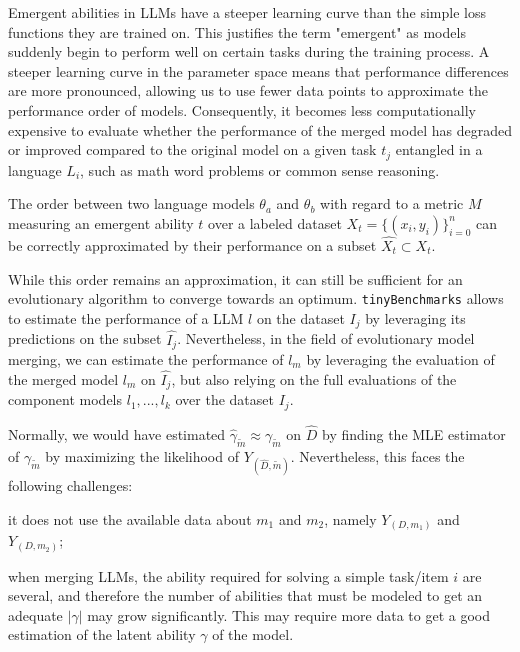
Emergent abilities in LLMs have a steeper learning curve than the simple loss functions they are trained on. This justifies the term "emergent" as models suddenly begin to perform well on certain tasks during the training process. A steeper learning curve in the parameter space means that performance differences are more pronounced, allowing us to use fewer data points to approximate the performance order of models. Consequently, it becomes less computationally expensive to evaluate whether the performance of the merged model has degraded or improved compared to the original model on a given task $t_j$ entangled in a language $L_i$, such as math word problems or common sense reasoning.
\begin{conjecture}\label{conj:approx}
    The order between two language models $\theta_{a}$ and $\theta_{b}$ with regard to a metric $M$ measuring an emergent ability $t$ over a labeled dataset $X_{t}=\{(x_i,y_i)\}_{i=0}^n$ can be correctly approximated by their performance on a subset $\hat{X_t} \subset X_t$.
\end{conjecture}
While this order remains an approximation, it can still be sufficient for an evolutionary algorithm to converge towards an optimum. 
\texttt{tinyBenchmarks} \citep{tinybenchmarks} allows to estimate the performance of a LLM $l$ on the dataset $I_j$ by leveraging its predictions on the subset $\hat{I_j}$. Nevertheless, in the field of evolutionary model merging, we can estimate the performance of $l_m$ by leveraging the evaluation of the merged model $l_m$ on $\hat{I_j}$, but also relying on the full evaluations of the component models $l_1,...,l_k$ over the dataset $I_j$.





Normally, we would have estimated $\hat{\gamma}_{\tilde{m}} \approx \gamma_{\tilde{m}}$ on $\hat{D}$ by finding the MLE estimator of  $\gamma_{\tilde{m}}$ by maximizing the likelihood of $Y_{(\hat{D},\tilde{m})}$. Nevertheless, this faces the following challenges: 
%
\begin{enumerate*}[label=(\roman*)]
  \item it does not use the available data about $m_1$ and $m_2$, namely $Y_{(D,m_1)}$ and $Y_{(D,m_2)}$;
  \item when merging LLMs, the ability required for solving a simple task/item $i$ are several, and therefore the number of abilities that must be modeled to get an adequate $|\gamma|$ may grow significantly. This may require more data to get a good estimation of the latent ability $\gamma$ of the model.
\end{enumerate*}



